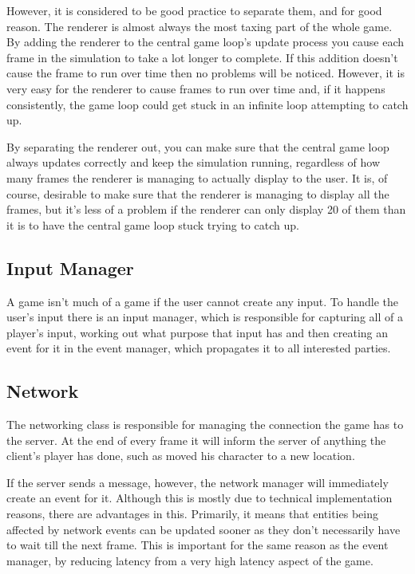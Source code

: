 However, it is considered to be good practice to separate them, and for good reason. The renderer is almost always the most taxing part of the whole game. By adding the renderer to the central game loop's update process you cause each frame in the simulation to take a lot longer to complete. If this addition doesn't cause the frame to run over time then no problems will be noticed. However, it is very easy for the renderer to cause frames to run over time and, if it happens consistently, the game loop could get stuck in an infinite loop attempting to catch up.

By separating the renderer out, you can make sure that the central game loop always updates correctly and keep the simulation running, regardless of how many frames the renderer is managing to actually display to the user. It is, of course, desirable to make sure that the renderer is managing to display all the frames, but it's less of a problem if the renderer can only display 20 of them than it is to have the central game loop stuck trying to catch up.

\subsection{Input Manager}
A game isn't much of a game if the user cannot create any input. To handle the user's input there is an input manager, which is responsible for capturing all of a player's input, working out what purpose that input has and then creating an event for it in the event manager, which propagates it to all interested parties.

\subsection{Network}
The networking class is responsible for managing the connection the game has to the server. At the end of every frame it will inform the server of anything the client's player has done, such as moved his character to a new location.

If the server sends a message, however, the network manager will immediately create an event for it. Although this is mostly due to technical implementation reasons, there are advantages in this. Primarily, it means that entities being affected by network events can be updated sooner as they don't necessarily have to wait till the next frame. This is important for the same reason as the event manager, by reducing latency from a very high latency aspect of the game.

